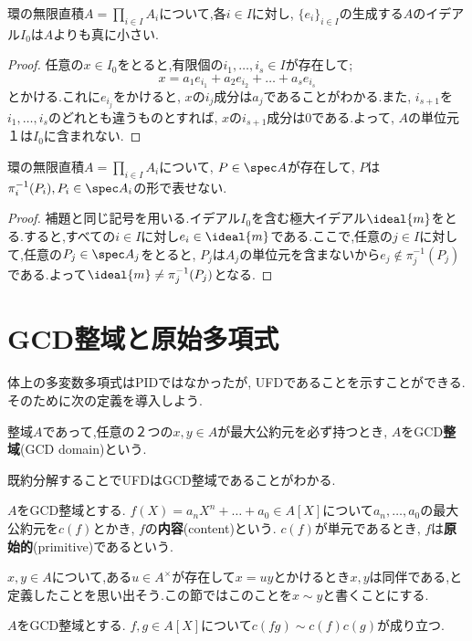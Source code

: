 \begin{lem}
	環の無限直積$A=\prod_{i\in I}A_i$について,各$i\in I$に対し, $\{e_i\}_{i\in I}$の生成する$A$のイデアル$I_0$は$A$よりも真に小さい.
\end{lem}

\begin{proof}
	任意の$x\in I_0$をとると,有限個の$i_1,\dots,i_s\in I$が存在して;
	\[x=a_1e_{i_1}+a_2e_{i_2}+\dots+a_se_{i_s}\]
	とかける.これに$e_{i_j}$をかけると, $x$の$i_j$成分は$a_j$であることがわかる.また, $i_{s+1}$を$i_1,\dots,i_s$のどれとも違うものとすれば, $x$の$i_{s+1}$成分は0である.よって, $A$の単位元$１$は$I_0$に含まれない.
\end{proof}

\begin{prop}
	環の無限直積$A=\prod_{i\in I}A_i$について, $P\in\spec A$が存在して, $P$は$\pi^{-1}_i(P_i), P_i\in\spec A_i$の形で表せない.
\end{prop}

\begin{proof}
	補題と同じ記号を用いる.イデアル$I_0$を含む極大イデアル$\ideal{m}$をとる.すると,すべての$i\in I$に対し$e_i\in\ideal{m}$である.ここで,任意の$j\in I$に対して,任意の$P_j\in\spec A_j$をとると, $P_j$は$A_j$の単位元を含まないから$e_j\not\in\pi^{-1}_j(P_j)$である.よって$\ideal{m}\neq\pi_j^{-1}(P_j)$となる.
\end{proof}

\section{GCD整域と原始多項式}
体上の多変数多項式はPIDではなかったが, UFDであることを示すことができる.そのために次の定義を導入しよう.

\begin{defi}[GCD整域]
	整域$A$であって,任意の２つの$x,y\in A$が最大公約元を必ず持つとき, $A$をGCD\textbf{整域}(GCD domain)という.
\end{defi}

既約分解することでUFDはGCD整域であることがわかる.

\begin{defi}[内容,原始多項式]
	$A$をGCD整域とする. $f(X)=a_nX^n+\dots+a_0\in A[X]$について$a_n,\dots,a_0$の最大公約元を$c(f)$とかき, $f$の\textbf{内容}(content)という. $c(f)$が単元であるとき, $f$は\textbf{原始的}(primitive)であるという.
\end{defi}

$x,y\in A$について,ある$u\in A^\times$が存在して$x=uy$とかけるとき$x,y$は同伴である,と定義したことを思い出そう.この節ではこのことを$x\sim y$と書くことにする.
\begin{lem}[Gaussの補題]
	$A$をGCD整域とする. $f,g\in A[X]$について$c(fg)\sim c(f)c(g)$が成り立つ.
\end{lem}


